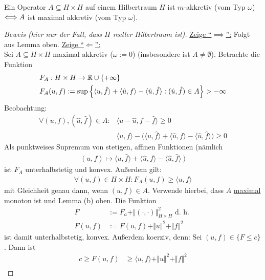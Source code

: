 \begin{theorem}[Minty]\enter
Ein Operator $A\subseteq H\times H$ auf einem Hilbertraum $H$ ist $m$-akkretiv (vom Typ $\omega$) $\Longleftrightarrow\\ A$ ist maximal akkretiv (vom Typ $\omega$).
\end{theorem}
\begin{proof}[Beweis (hier nur der Fall, dass $H$ reeller Hilbertraum ist)]\enter
\underline{Zeige ``$\implies$'':} Folgt aus Lemma oben.\nl
\underline{Zeige ``$\Longleftarrow$'':}\\
Sei $A\subseteq H\times H$ maximal akkretiv ($\omega:=0$) (insbesondere ist $A\neq\emptyset$). Betrachte die Funktion 
\begin{align*}
&F_A:H\times H\to\mathbb{R}\cup\lbrace+\infty\rbrace\\
&F_A(u,f):=\sup\Big\lbrace\langle u,\hat{f}\rangle+\langle\hat{u},f\rangle-\langle\hat{u},\hat{f}\rangle:(\hat{u},\hat{f})\in A\Big\rbrace>-\infty
\end{align*}
Beobachtung: 
\begin{align*}
\forall (u,f),(\hat{u},\hat{f})\in A:
&\big\langle u-\hat{u},f-\hat{f}\big\rangle\geq0\\
&\langle u,f\rangle-\Big(\big\langle u,\hat{f}\big\rangle+\big\langle\hat{u},f\big\rangle-\big\langle\hat{u},\hat{f}\big\rangle\Big)\geq0
\end{align*}
Als punktweises Supremum von stetigen, affinen Funktionen (nämlich 
\begin{align*}
(u,f)\mapsto\big\langle u,\hat{f}\big\rangle+\big\langle\hat{u},f\big\rangle-\big\langle\hat{u},\hat{f}\big\rangle~\big)
\end{align*}
ist $F_A$ unterhalbstetig und konvex. Außerdem gilt:
\begin{align*}
\forall (u,f)\in H\times H:F_A(u,f)\geq\langle u,f\rangle
\end{align*}
mit Gleichheit genau dann, wenn $(u,f)\in A$. Verwende hierbei, dass $A$ \ul{maximal} monoton ist und Lemma (b) oben. Die Funktion
\begin{align*}
F&:=F_a+\Vert(\cdot,\cdot)\Vert^2_{H\times H}\text{ d. h. }\\
F(u,f)&:=F(u,f)+\Vert u\Vert^2+\Vert f\Vert^2
\end{align*}
ist damit unterhalbstetig, konvex. Außerdem koerziv, denn: Sei $(u,f)\in\lbrace F\leq c\rbrace$. Dann ist
\begin{align*}
c\geq F(u,f)
&\geq\langle u,f\rangle+\Vert u\Vert^2+\Vert f\Vert^2\\

\end{align*}
\end{proof}
